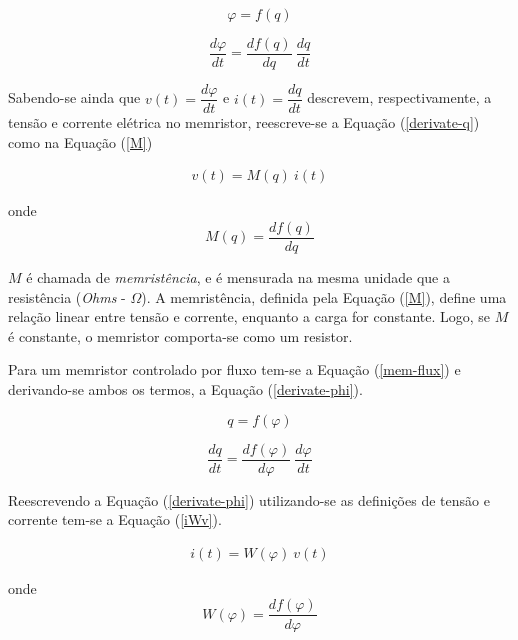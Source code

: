 \documentclass{ceel}
\begin{document}
\begin{multicols}{2}
\begin{equation}\label{mem-charge}
\varphi = f(q)
\end{equation}

\begin{equation}\label{derivate-q}
\dfrac{d\varphi}{dt}=\dfrac{df(q)}{dq} \ \dfrac{dq}{dt}
\end{equation}
\vspace{0.1cm}

Sabendo-se ainda que $v(t)=\dfrac{d\varphi}{dt}$ e $i(t)=\dfrac{dq}{dt}$ descrevem, respectivamente, a tensão e corrente elétrica no memristor, 
reescreve-se a Equação (\ref{derivate-q}) como na Equação (\ref{M}) 

\begin{gather}\label{vMi}
v(t)=M(q)\ i(t)
\end{gather}

\noindent onde
\begin{equation} \label{M}
M(q) =\dfrac{df(q)}{dq}
\end{equation}
\vspace{0.05cm}

$M$ é chamada de \textit{memristência}, e é mensurada na mesma unidade que a resistência (\textit{Ohms} - $\Omega$). A memristência, definida pela Equação (\ref{M}), define uma relação linear entre tensão e corrente, enquanto a carga for constante. Logo, se $M$ é constante, o memristor comporta-se como um resistor.

Para um memristor controlado por fluxo tem-se a Equação (\ref{mem-flux}) e derivando-se ambos os termos, a Equação (\ref{derivate-phi}).

\begin{equation}\label{mem-flux}
q = f(\varphi)
\end{equation}

\begin{equation}\label{derivate-phi}
\dfrac{dq}{dt}=\dfrac{df(\varphi)}{d\varphi} \ \dfrac{d\varphi}{dt}
\end{equation}
\vspace{0.05cm}

Reescrevendo a Equação (\ref{derivate-phi}) utilizando-se as definições de tensão e corrente tem-se a  Equação (\ref{iWv}).

\begin{gather}\label{iWv}
i(t)=W(\varphi)\ v(t)
\end{gather}

\noindent onde
\begin{equation} \label{W}
W(\varphi) =\dfrac{df(\varphi)}{d\varphi}
\end{equation}
\vspace{0.05cm}


\end{multicols}
\end{document}
